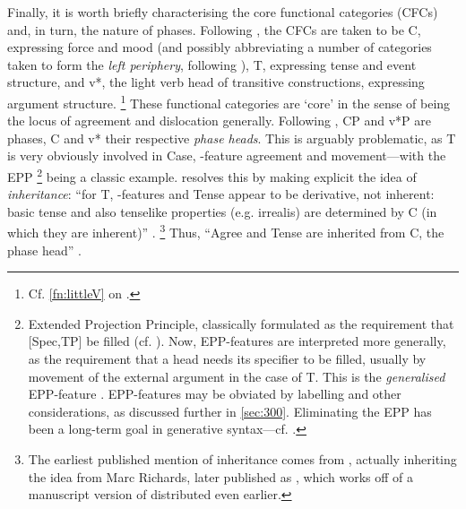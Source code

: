 Finally, it is worth briefly characterising the core functional categories (CFCs) and, in turn, the nature of phases. Following \textcite{ChomskyN_2000}, the CFCs are taken to be C, expressing force and mood (and possibly abbreviating a number of categories taken to form the \textit{left periphery}, following ), T, expressing tense and event structure, and v*, the light verb head of transitive constructions, expressing argument structure.%
\footnote{Cf. \autoref{fn:littleV} on \littleV.}
These functional categories are `core' in the sense of being the locus of agreement and dislocation generally. Following \textcite{ChomskyN_2008}, CP and v*P are phases, C and v* their respective \textit{phase heads}. This is arguably problematic, as T is very obviously involved in Case, \phiF-feature agreement and movement---with the EPP%
\footnote{Extended Projection Principle, classically formulated as the requirement that [Spec,TP] be filled (cf. ). Now, EPP-features are interpreted more generally, as the requirement that a head needs its specifier to be filled, usually by movement of the external argument in the case of T. This is the \textit{generalised} EPP-feature \parencite[see][]{HaegemanL_1996,LaenzlingerC_1998,RobertsI_2004}. EPP-features may be obviated by labelling and other considerations, as discussed further in \autoref{sec:300}. Eliminating the EPP has been a long-term goal in generative syntax---cf. \textcite{BoskovicZ_2007}.}
being a classic example. \textcite{ChomskyN_2008} resolves this by making explicit the idea of \textit{inheritance}: ``for T, \phiF-features and Tense appear to be derivative, not inherent: basic tense and also tenselike properties (e.g. irrealis) are determined by C (in which they are inherent)'' \parencite[143]{ChomskyN_2008}.%
\footnote{The earliest published mention of inheritance comes from \textcite{ChomskyN_2007}, actually inheriting the idea from Marc Richards, later published as \textcite{RichardsMD_2007}, which works off of a manuscript version of \textcite{ChomskyN_2008} distributed even earlier.}
Thus, ``Agree and Tense are inherited from C, the phase head'' \parencite[143-144]{ChomskyN_2008}.

